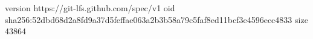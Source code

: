 version https://git-lfs.github.com/spec/v1
oid sha256:52dbd68d2a8fd9a37d5feffae063a2b3b58a79c5faf8ed11bcf3e4596ecc4833
size 43864
